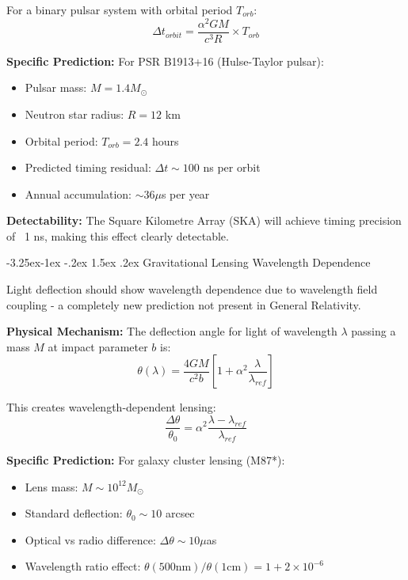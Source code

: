 \documentclass[10pt,twocolumn]{article}
\makeatletter
\renewcommand\subsection{\@startsection{subsection}{2}{\z@}%
  {-3.25ex\@plus -1ex \@minus -.2ex}%
  {1.5ex \@plus .2ex}%
  {\normalfont\normalsize\bfseries}}
\makeatother
\begin{document}
For a binary pulsar system with orbital period $T_{orb}$:
\begin{equation}
\Delta t_{orbit} = \frac{\alpha^2 GM}{c^3 R} \times T_{orb}
\end{equation}

\textbf{Specific Prediction:}
For PSR B1913+16 (Hulse-Taylor pulsar):
\begin{itemize}
\item Pulsar mass: $M = 1.4 M_\odot$
\item Neutron star radius: $R = 12$ km
\item Orbital period: $T_{orb} = 2.4$ hours
\item Predicted timing residual: $\Delta t \sim 100$ ns per orbit
\item Annual accumulation: $\sim 36 \mu$s per year
\end{itemize}

\textbf{Detectability:} The Square Kilometre Array (SKA) will achieve timing precision of ~1 ns, making this effect clearly detectable.

\subsection{Gravitational Lensing Wavelength Dependence}

Light deflection should show wavelength dependence due to wavelength field coupling - a completely new prediction not present in General Relativity.

\textbf{Physical Mechanism:}
The deflection angle for light of wavelength $\lambda$ passing a mass $M$ at impact parameter $b$ is:
\begin{equation}
\theta(\lambda) = \frac{4GM}{c^2 b}\left[1 + \alpha^2 \frac{\lambda}{\lambda_{ref}}\right]
\end{equation}

This creates wavelength-dependent lensing:
\begin{equation}
\frac{\Delta\theta}{\theta_0} = \alpha^2 \frac{\lambda - \lambda_{ref}}{\lambda_{ref}}
\end{equation}

\textbf{Specific Prediction:}
For galaxy cluster lensing (M87*):
\begin{itemize}
\item Lens mass: $M \sim 10^{12} M_\odot$
\item Standard deflection: $\theta_0 \sim 10$ arcsec
\item Optical vs radio difference: $\Delta\theta \sim 10 \mu$as
\item Wavelength ratio effect: $\theta(500\text{nm})/\theta(1\text{cm}) = 1 + 2 \times 10^{-6}$
\end{itemize}
\end{document}
